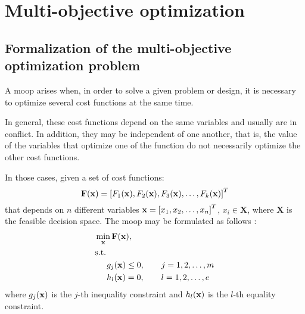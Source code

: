 \chapter{Multi-objective optimization}
\label{sec:Metodolgia}


\section{Formalization of the multi-objective optimization problem}
\label{sec:MOOPForm}
%
A \gls{moop} arises when, in order to solve a given problem or design, it is necessary to optimize several cost functions at the same time. 

In general, these cost functions depend on the same variables and usually are in conflict.  In addition, they may be independent of one another, that is, the value of the variables that optimize one of the function do not necessarily optimize the other cost functions.

In those cases, given a set of cost functions:
\begin{equation}
\mathbf{F}(\mathbf{x})=\left[F_1(\mathbf{x}), F_2(\mathbf{x}), F_3(\mathbf{x}), \ldots, F_k(\mathbf{x})\right]^T
\label{eq:functions}
\end{equation}
%
that depends on $n$ different variables $\mathbf{x}=\left[x_1, x_2, \ldots, x_n \right]^T$, $x_i \in \mathbf{X}$, where $\mathbf{X}$ is the feasible decision space. The \gls{moop} may be formulated as follows \cite{Marler2004}:%
%
\begin{subequations}%
	\begin{align}%
	&\min_\xv \mathbf{F}(\xv), \label{eq:Min01}\\ %
	&\text{s.t.}\nonumber\\%
	& \hspace{5mm} g_j(\xv) \leq 0, \qquad j=1,2,\ldots,m  \label{eq:Min02}\\ %
	& \hspace{5mm} h_l(\xv) = 0, \qquad l=1,2,\ldots,e  \label{eq:Min03}%
	\end{align}%
	\label{eq:OptProb}%
\end{subequations}%
%
where $g_j(\mathbf{x})$ is the $j$-th inequality constraint and $h_l(\mathbf{x})$ is the $l$-th equality constraint. 
%
